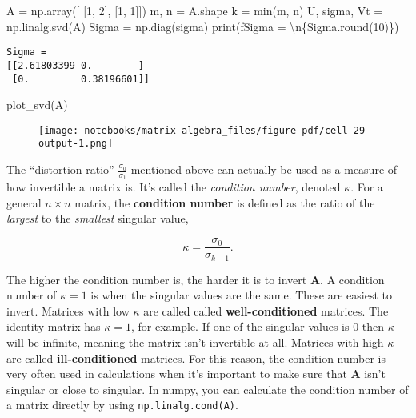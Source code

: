 \documentclass[
  letterpaper,
  DIV=11,
  numbers=noendperiod]{scrreprt}
\newenvironment{Shaded}{\begin{snugshade}}{\end{snugshade}}
\newcommand{\BuiltInTok}[1]{\textcolor[rgb]{0.00,0.23,0.31}{#1}}
\newcommand{\CharTok}[1]{\textcolor[rgb]{0.13,0.47,0.30}{#1}}
\newcommand{\DecValTok}[1]{\textcolor[rgb]{0.68,0.00,0.00}{#1}}
\newcommand{\NormalTok}[1]{\textcolor[rgb]{0.00,0.23,0.31}{#1}}
\newcommand{\OperatorTok}[1]{\textcolor[rgb]{0.37,0.37,0.37}{#1}}
\newcommand{\SpecialCharTok}[1]{\textcolor[rgb]{0.37,0.37,0.37}{#1}}
\newcommand{\SpecialStringTok}[1]{\textcolor[rgb]{0.13,0.47,0.30}{#1}}
\begin{document}
\begin{Shaded}
\begin{Highlighting}[]
\NormalTok{A }\OperatorTok{=}\NormalTok{ np.array([}
\NormalTok{    [}\DecValTok{1}\NormalTok{, }\DecValTok{2}\NormalTok{],}
\NormalTok{    [}\DecValTok{1}\NormalTok{, }\DecValTok{1}\NormalTok{]])}
\NormalTok{m, n }\OperatorTok{=}\NormalTok{ A.shape}
\NormalTok{k }\OperatorTok{=} \BuiltInTok{min}\NormalTok{(m, n)}
\NormalTok{U, sigma, Vt }\OperatorTok{=}\NormalTok{ np.linalg.svd(A)}
\NormalTok{Sigma }\OperatorTok{=}\NormalTok{ np.diag(sigma)}
\BuiltInTok{print}\NormalTok{(}\SpecialStringTok{f\textquotesingle{}Sigma = }\CharTok{\textbackslash{}n}\SpecialCharTok{\{}\NormalTok{Sigma}\SpecialCharTok{.}\BuiltInTok{round}\NormalTok{(}\DecValTok{10}\NormalTok{)}\SpecialCharTok{\}}\SpecialStringTok{\textquotesingle{}}\NormalTok{)}
\end{Highlighting}
\end{Shaded}

\begin{verbatim}
Sigma = 
[[2.61803399 0.        ]
 [0.         0.38196601]]
\end{verbatim}

\begin{Shaded}
\begin{Highlighting}[]
\NormalTok{plot\_svd(A)}
\end{Highlighting}
\end{Shaded}

\begin{figure}[H]

{\centering \texttt{[image: notebooks/matrix-algebra\_files/figure-pdf/cell-29-output-1.png]}

}

\end{figure}

The ``distortion ratio'' \(\frac{\sigma_0}{\sigma_1}\) mentioned above
can actually be used as a measure of how invertible a matrix is. It's
called the \emph{condition number}, denoted \(\kappa\). For a general
\(n \times n\) matrix, the \textbf{condition number} is defined as the
ratio of the \emph{largest} to the \emph{smallest} singular value,

\[\kappa = \frac{\sigma_0}{\sigma_{k-1}}.\]

The higher the condition number is, the harder it is to invert
\(\mathbf{A}\). A condition number of \(\kappa=1\) is when the singular
values are the same. These are easiest to invert. Matrices with low
\(\kappa\) are called called \textbf{well-conditioned} matrices. The
identity matrix has \(\kappa=1\), for example. If one of the singular
values is \(0\) then \(\kappa\) will be infinite, meaning the matrix
isn't invertible at all. Matrices with high \(\kappa\) are called
\textbf{ill-conditioned} matrices. For this reason, the condition number
is very often used in calculations when it's important to make sure that
\(\mathbf{A}\) isn't singular or close to singular. In numpy, you can
calculate the condition number of a matrix directly by using
\texttt{np.linalg.cond(A)}.
\end{document}
